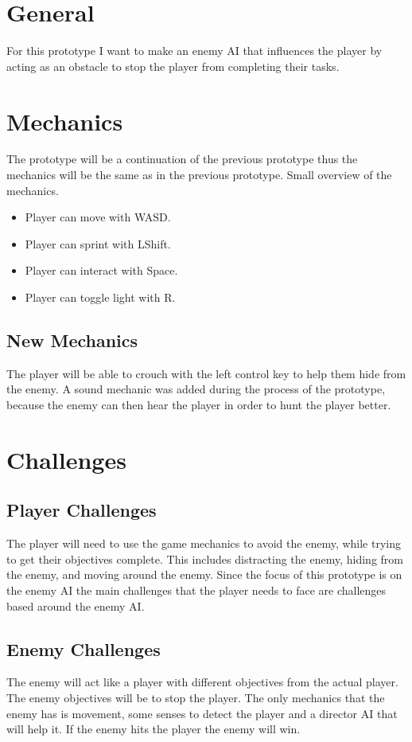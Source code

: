 \documentclass{article}
\begin{document}
\section*{General}
For this prototype I want to make an enemy AI that influences the player
by acting as an obstacle to stop the player from completing their tasks.

\section*{Mechanics}
The prototype will be a continuation of the previous prototype
thus the mechanics will be the same as in the previous prototype.
Small overview of the mechanics.
\begin{itemize}
    \item Player can move with WASD.
    \item Player can sprint with LShift.
    \item Player can interact with Space.
    \item Player can toggle light with R.
\end{itemize}
\subsection*{New Mechanics}
The player will be able to crouch with the left control key to help
them hide from the enemy.
A sound mechanic was added during the process of the prototype, because the
enemy can then hear the player in order to hunt the player better.

\section*{Challenges}
\subsection*{Player Challenges}
The player will need to use the game mechanics to avoid the enemy, while
trying to get their objectives complete. This includes distracting the 
enemy, hiding from the enemy, and moving around the enemy. 
Since the focus of this prototype is on the enemy AI the main challenges
that the player needs to face are challenges based around the enemy AI.

\subsection*{Enemy Challenges}
The enemy will act like a player with different objectives from the actual 
player. The enemy objectives will be to stop the player. The only mechanics
that the enemy has is movement, some senses to detect the player and a 
director AI that will help it. If the enemy hits the player the enemy will win.
\end{document}
